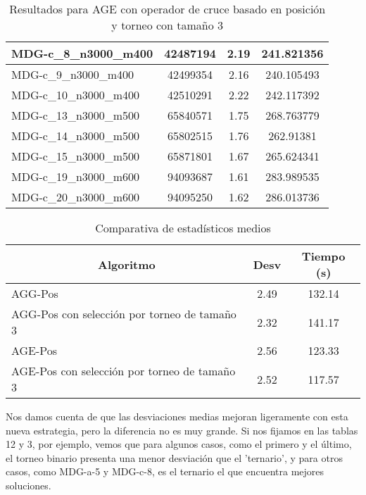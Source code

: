 \documentclass[10pt,a4paper]{article}
\begin{document}
\begin{table}[H]
\begin{center}
\begin{tabular}{|l|c|c|c|}
					MDG-c\_8\_n3000\_m400 & 42487194 & 2.19 & 241.821356 \\ \hline
					MDG-c\_9\_n3000\_m400 & 42499354 & 2.16 & 240.105493 \\ \hline
					MDG-c\_10\_n3000\_m400 & 42510291 & 2.22 & 242.117392 \\ \hline
					MDG-c\_13\_n3000\_m500 & 65840571 & 1.75 & 268.763779 \\ \hline
					MDG-c\_14\_n3000\_m500 & 65802515 & 1.76 & 262.91381 \\ \hline
					MDG-c\_15\_n3000\_m500 & 65871801 & 1.67 & 265.624341 \\ \hline
					MDG-c\_19\_n3000\_m600 & 94093687 & 1.61 & 283.989535 \\ \hline
					MDG-c\_20\_n3000\_m600 & 94095250 & 1.62 & 286.013736 \\ \hline
				\end{tabular}
				\caption{Resultados para AGE con operador de cruce basado en posición y torneo con tamaño 3}
				\label{}
				\end{center}
			\end{table}
		
		\begin{table}[H]
			\begin{center}
				\begin{tabular}{|l|c|c|}
					\hline
					\multicolumn{1}{|c|}{\textbf{Algoritmo}} & \textbf{Desv} & \textbf{Tiempo (s)} \\ \hline
					AGG-Pos & 2.49 & 132.14 \\ \hline
					AGG-Pos con selección por torneo de tamaño 3 & 2.32 & 141.17 \\ \hline
					AGE-Pos & 2.56 & 123.33 \\ \hline
					AGE-Pos con selección por torneo de tamaño 3 & 2.52 & 117.57 \\ \hline
				\end{tabular}
			\end{center}
			\caption{Comparativa de estadísticos medios}
			\label{}
		\end{table}
			
Nos damos cuenta de que las desviaciones medias mejoran ligeramente con esta nueva estrategia, pero la diferencia no es muy grande. Si nos fijamos en las tablas 12 y 3, por ejemplo, vemos que para algunos casos, como el primero y el último, el torneo binario presenta una menor desviación que el 'ternario', y para otros casos, como MDG-a-5 y MDG-c-8, es el ternario el que encuentra mejores soluciones. 
\end{document}
